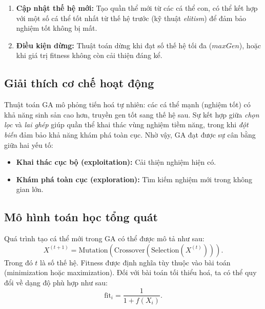 \documentclass[a4paper]{report}
\begin{document}
\begin{enumerate}
    \item \textbf{Cập nhật thế hệ mới:}  
    Tạo quần thể mới từ các cá thể con, có thể kết hợp với một số cá thể tốt nhất từ thế hệ trước (kỹ thuật \textit{elitism}) để đảm bảo nghiệm tốt không bị mất.

    \item \textbf{Điều kiện dừng:}  
    Thuật toán dừng khi đạt số thế hệ tối đa ($maxGen$), hoặc khi giá trị fitness không còn cải thiện đáng kể.
\end{enumerate}

\subsection{Giải thích cơ chế hoạt động}
Thuật toán GA mô phỏng tiến hoá tự nhiên: các cá thể mạnh (nghiệm tốt) có khả năng sinh sản cao hơn, truyền gen tốt sang thế hệ sau.  
Sự kết hợp giữa \textit{chọn lọc} và \textit{lai ghép} giúp quần thể khai thác vùng nghiệm tiềm năng, trong khi \textit{đột biến} đảm bảo khả năng khám phá toàn cục.  
Nhờ vậy, GA đạt được sự cân bằng giữa hai yếu tố:
\begin{itemize}
    \item \textbf{Khai thác cục bộ (exploitation):} Cải thiện nghiệm hiện có.
    \item \textbf{Khám phá toàn cục (exploration):} Tìm kiếm nghiệm mới trong không gian lớn.
\end{itemize}

\subsection{Mô hình toán học tổng quát}
Quá trình tạo cá thể mới trong GA có thể được mô tả như sau:
\[
X^{(t+1)} = \mathrm{Mutation}(\mathrm{Crossover}(\mathrm{Selection}(X^{(t)}))).
\]
Trong đó $t$ là số thế hệ.  
Fitness được định nghĩa tùy thuộc vào bài toán (minimization hoặc maximization).  
Đối với bài toán tối thiểu hoá, ta có thể quy đổi về dạng độ phù hợp như sau:
\[
\mathrm{fit}_i = \frac{1}{1 + f(X_i)}.
\]
\end{document}
